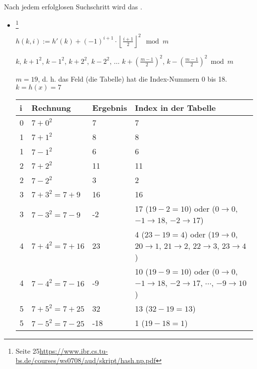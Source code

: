 \documentclass{lehramt-informatik}
\begin{document}
Nach jedem erfolglosen Suchschritt wird das .


\begin{itemize}

%

\item {}
\footnote{Seite 25\url{https://www.ibr.cs.tu-bs.de/courses/ws0708/aud/skript/hash.np.pdf}}


$h(k, i) := h'(k) + (-1)^{i+1} \cdot \left\lfloor \frac{i+1}{2}\right\rfloor ^2 \mod m$

$k$, $k+1^2$, $k-1^2$, $k+2^2$, $k-2^2$,
$\ldots$
$k+(\frac{m-1}{2})^2$, $k-(\frac{m-1}{2})^2 \bmod m$


$m=19$, d. h. das Feld (die Tabelle) hat die Index-Nummern 0 bis 18.
$k = h(x) = 7$


\def\tmp#1{{\tiny#1}}

\begin{tabular}{|l|l|l|l|}
i & Rechnung & Ergebnis & Index in der Tabelle\\\hline\hline
0 & $7 + 0^2$ & 7 & 7\\
1 & $7 + 1^2$ & 8 & 8\\
1 & $7 - 1^2$ & 6 & 6\\
2 & $7 + 2^2$ & 11 & 11\\
2 & $7 - 2^2$ & 3 & 2 \\
3 & $7 + 3^2 = 7 + 9$  & 16 & 16 \\

3 & $7 - 3^2 = 7 - 9$  & -2 &
17 \tmp{($19-2=10$) oder ($0 \rightarrow 0$, $-1 \rightarrow 18$, $-2 \rightarrow 17$)}
\\

4 & $7 + 4^2 = 7 + 16$  & 23 &
4 \tmp{($23-19=4$) oder ($19 \rightarrow 0$, $20 \rightarrow 1$, $21 \rightarrow 2$, $22 \rightarrow 3$, $23 \rightarrow 4$)}
\\

4 & $7 - 4^2 = 7 - 16$  & -9 &
10 \tmp{($19-9=10$) oder ($0 \rightarrow 0$, $-1 \rightarrow 18$, $-2 \rightarrow 17$, $\cdots$, $-9 \rightarrow 10$)}
\\

5 & $7 + 5^2 = 7 + 25$  & 32 & 13 \tmp{($32-19=13$)} \\
5 & $7 - 5^2 = 7 - 25$  & -18 & 1 \tmp{($19-18=1$)}\\
\end{tabular}


\end{itemize}
\end{document}

